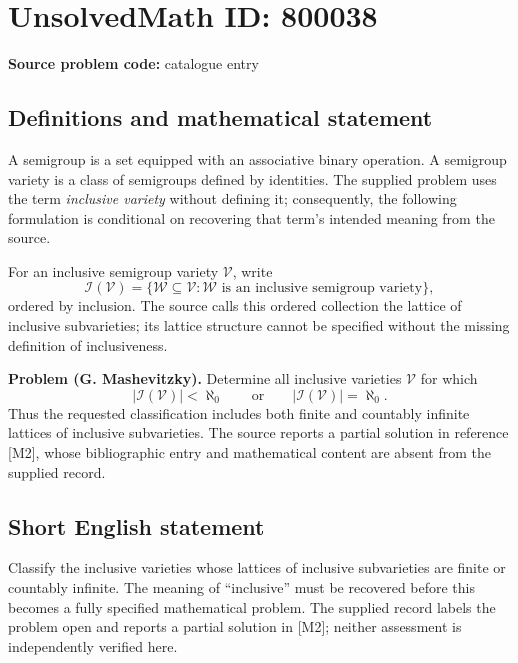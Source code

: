 \documentclass[11pt]{article}
\begin{document}
\section*{UnsolvedMath ID: 800038}
\textbf{Source problem code:} catalogue entry
\subsection{Definitions and mathematical statement}
A semigroup is a set equipped with an associative binary operation. A semigroup variety is a class of semigroups defined by identities. The supplied problem uses the term \emph{inclusive variety} without defining it; consequently, the following formulation is conditional on recovering that term's intended meaning from the source.

For an inclusive semigroup variety \(\mathcal V\), write
\[
\mathcal I(\mathcal V)=\{\mathcal W\subseteq\mathcal V: \mathcal W\text{ is an inclusive semigroup variety}\},
\]
ordered by inclusion. The source calls this ordered collection the lattice of inclusive subvarieties; its lattice structure cannot be specified without the missing definition of inclusiveness.

\textbf{Problem (G. Mashevitzky).} Determine all inclusive varieties \(\mathcal V\) for which
\[
|\mathcal I(\mathcal V)|<\aleph_0
\qquad\text{or}\qquad
|\mathcal I(\mathcal V)|=\aleph_0.
\]
Thus the requested classification includes both finite and countably infinite lattices of inclusive subvarieties. The source reports a partial solution in reference [M2], whose bibliographic entry and mathematical content are absent from the supplied record.
\subsection{Short English statement}
Classify the inclusive varieties whose lattices of inclusive subvarieties are finite or countably infinite. The meaning of ``inclusive'' must be recovered before this becomes a fully specified mathematical problem. The supplied record labels the problem open and reports a partial solution in [M2]; neither assessment is independently verified here.
\end{document}
